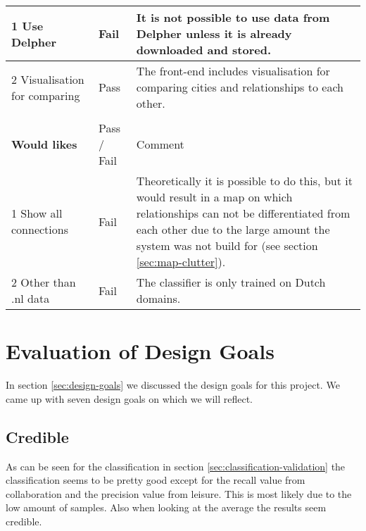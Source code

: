 \begin{table}[H]
\begin{tabular}{ll m{8cm}}
1 Use Delpher                  & Fail        & It is not possible to use data from Delpher unless it is already downloaded and stored.                                                                                                                                               \\ \hline
2 Visualisation for comparing  & Pass        & The front-end includes visualisation for comparing cities and relationships to each other.                                                                                                                                            \\
                               &             &                                                                                                                                                                                                                                       \\
\textbf{Would likes}                    & Pass / Fail & Comment                                                                                                                                                                                                                               \\
1 Show all connections         & Fail        & Theoretically it is possible to do this, but it would result in a map on which relationships can not be differentiated from each other due to the large amount the system was not build for (see section \ref{sec:map-clutter}). \\ \hline
2 Other than .nl data          & Fail        & The classifier is only trained on Dutch domains.                                                                 
\end{tabular}
\end{table}

\section{Evaluation of Design Goals}
In section \ref{sec:design-goals} we discussed the design goals for this project. We came up with seven design goals on which we will reflect.

\subsection{Credible}
As can be seen for the classification in section \ref{sec:classification-validation} the classification seems to be pretty good except for the recall value from collaboration and the precision value from leisure. This is most likely due to the low amount of samples. Also when looking at the average the results seem credible.

